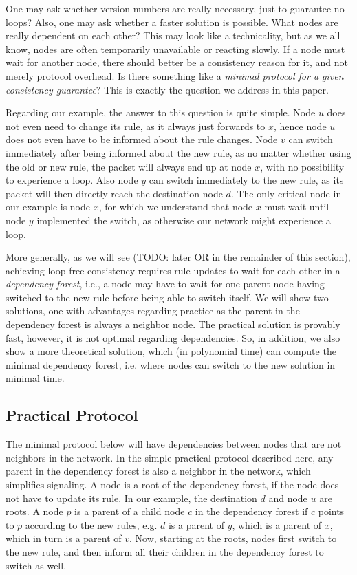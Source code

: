 One may ask whether version numbers are really necessary, just to guarantee no loops? Also, one may ask whether a faster solution is possible. What nodes are really dependent on each other? This may look like a technicality, but as we all know, nodes are often temporarily unavailable or reacting slowly. If a node must wait for another node, there should better be a consistency reason for it, and not merely protocol overhead. Is there something like a \emph{minimal protocol for a given consistency guarantee}? This is exactly the question we address in this paper.

Regarding our example, the answer to this question is quite simple. Node $u$ does not even need to change its rule, as it always just forwards to $x$, hence node $u$ does not even have to be informed about the rule changes. Node $v$ can switch immediately after being informed about the new rule, as no matter whether using the old or new rule, the packet will always end up at node $x$, with no possibility to experience a loop. Also node $y$ can switch immediately to the new rule, as its packet will then directly reach the destination node $d$. The only critical node in our example is node $x$, for which we understand that node $x$ must wait until node $y$ implemented the switch, as otherwise our network might experience a loop.

More generally, as we will see (TODO: later OR in the remainder of this section), achieving loop-free consistency requires rule updates to wait for each other in a \emph{dependency forest}, i.e., a node may have to wait for one parent node having switched to the new rule before being able to switch itself. We will show two solutions, one with advantages regarding practice as the parent in the dependency forest is always a neighbor node. The practical solution is provably fast, however, it is not optimal regarding dependencies. So, in addition, we also show a more theoretical solution, which (in polynomial time) can compute the minimal dependency forest, i.e. where nodes can switch to the new solution in minimal time.

\subsection{Practical Protocol}

The minimal protocol below will have dependencies between nodes that are not neighbors in the network. In the simple practical protocol described here, any parent in the dependency forest is also a neighbor in the network, which simplifies signaling. A node is a root of the dependency forest, if the node does not have to update its rule. In our example, the destination $d$ and node $u$ are roots. A node $p$ is a parent of a child node $c$ in the dependency forest if $c$ points to $p$ according to the new rules, e.g. $d$ is a parent of $y$, which is a parent of $x$, which in turn is a parent of $v$. Now, starting at the roots, nodes first switch to the new rule, and then inform all their children in the dependency forest to switch as well.

